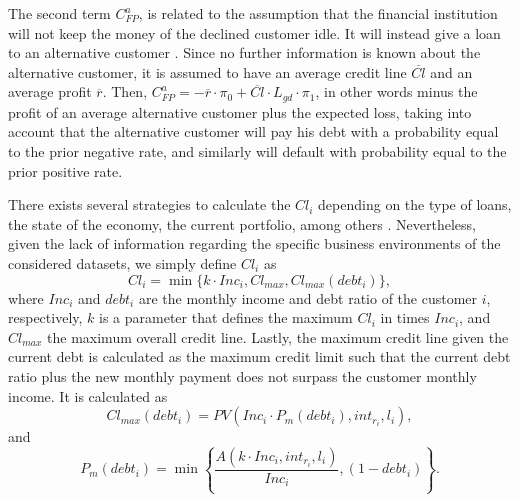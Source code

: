   The second term $C^a_{FP}$, is related to the assumption that the financial institution will not 
  keep the money of the declined customer idle. It will instead give a loan to an alternative 
  customer \citep{Nayak1997}. Since no further information is known about the alternative customer, 
  it is assumed to have an average credit line $\overline{Cl}$ and an average profit $\overline{r}$.
  Then, \mbox{$C^a_{FP}=- \overline{r} \cdot \pi_0+\overline{Cl}\cdot L_{gd} \cdot \pi_1$}, in 
  other words minus the profit of an average alternative customer plus the expected loss, taking 
  into account that the alternative customer will pay his debt with a probability equal to the 
  prior negative rate, and similarly will default with probability equal to the prior positive rate.

      
      
      There exists several strategies to calculate the $Cl_i$ depending on the 
type of loans, the 
    state of the economy, the current portfolio, among others \citep{Anderson2007,Lawrence2012}.
    Nevertheless, given the lack of information regarding the specific business environments of the 
    considered datasets, we simply define $Cl_i$ as
    \begin{equation}\label{eq:cli}
      Cl_i = \min \bigg\{ k \cdot Inc_i, Cl_{max}, Cl_{max}(debt_i) \bigg\},
    \end{equation}
    where $Inc_i$ and $debt_i$ are the monthly income and debt ratio of the customer $i$, 
    respectively, $k$ is a parameter that defines the maximum $Cl_i$ in times $Inc_i$, and 
    $Cl_{max}$ the maximum overall credit line. Lastly, the maximum credit line given the current 
    debt is calculated as the maximum credit limit such that the current debt ratio plus the new 
    monthly payment does not surpass the customer monthly income. It is calculated as
    \begin{equation}
      Cl_{max}(debt_i)=PV\left(Inc_i \cdot P_{m}(debt_i),int_{r_i},l_i\right),
    \end{equation}
    and
    \begin{equation}
      P_{m}(debt_i)=\min \left\{ \frac{A(k \cdot Inc_i,int_{r_i},l_i)}{Inc_i},\left(1-debt_i 
      \right) \right\}.
    \end{equation}
  
  
